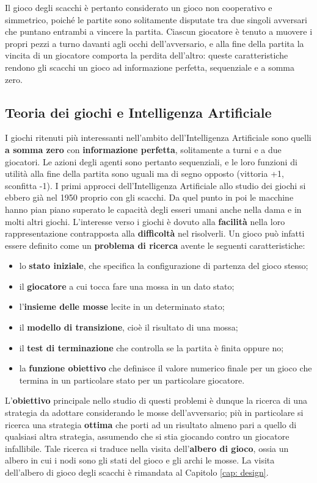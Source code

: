 Il gioco degli scacchi è pertanto considerato un gioco non cooperativo e simmetrico, poiché le partite sono solitamente disputate tra due singoli avversari che puntano entrambi a vincere la partita. Ciascun giocatore è tenuto a muovere i propri pezzi a turno davanti agli occhi dell'avversario, e alla fine della partita la vincita di un giocatore comporta la perdita dell'altro: queste caratteristiche rendono gli scacchi un gioco ad informazione perfetta, sequenziale e a somma zero. 
\subsection{Teoria dei giochi e Intelligenza Artificiale}
I giochi ritenuti più interessanti nell'ambito dell'Intelligenza Artificiale sono quelli \textbf{a somma zero} con \textbf{informazione perfetta}, solitamente a turni e a due giocatori. Le azioni degli agenti sono pertanto sequenziali, e le loro funzioni di utilità alla fine della partita sono uguali ma di segno opposto (vittoria +1, sconfitta -1). I primi approcci dell'Intelligenza Artificiale allo studio dei giochi si ebbero già nel 1950 proprio con gli scacchi. Da quel punto in poi le macchine hanno pian piano superato le capacità degli esseri umani anche nella dama e in molti altri giochi\cite{schaeffer2007checkers}. L'interesse verso i giochi è dovuto alla \textbf{facilità} nella loro rappresentazione contrapposta alla \textbf{difficoltà} nel risolverli\cite{russell2005intelligenza}. Un gioco può infatti essere definito come un \textbf{problema di ricerca} avente le seguenti caratteristiche:
\begin{itemize}
    \item lo \textbf{stato iniziale}, che specifica la configurazione di partenza del gioco stesso;
    \item il \textbf{giocatore} a cui tocca fare una mossa in un dato stato;
    \item l'\textbf{insieme delle mosse} lecite in un determinato stato;
    \item il \textbf{modello di transizione}, cioè il risultato di una mossa;
    \item il \textbf{test di terminazione} che controlla se la partita è finita oppure no;
    \item la \textbf{funzione obiettivo} che definisce il valore numerico finale per un gioco che termina in un particolare stato per un particolare giocatore.
\end{itemize}
L'\textbf{obiettivo} principale nello studio di questi problemi è dunque la ricerca di una strategia da adottare considerando le mosse dell'avversario; più in particolare si ricerca una strategia \textbf{ottima} che porti ad un risultato almeno pari a quello di qualsiasi altra strategia, assumendo che si stia giocando contro un giocatore infallibile. Tale ricerca si traduce nella visita dell'\textbf{albero di gioco}, ossia un albero in cui i nodi sono gli stati del gioco e gli archi le mosse. La visita dell'albero di gioco degli scacchi è rimandata al Capitolo \ref{cap: design}. 

